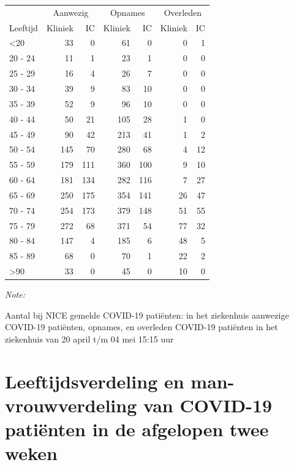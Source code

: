 \documentclass[
  english,
  man,floatsintext]{apa6}
\begin{document}
\begin{table}
\centering\begingroup\fontsize{10}{12}\selectfont

\begin{threeparttable}
\begin{tabular}{lrrrrrr}
\toprule
\multicolumn{1}{c}{ } & \multicolumn{2}{c}{Aanwezig} & \multicolumn{2}{c}{Opnames} & \multicolumn{2}{c}{Overleden} \\
\cmidrule(l{3pt}r{3pt}){2-3} \cmidrule(l{3pt}r{3pt}){4-5} \cmidrule(l{3pt}r{3pt}){6-7}
Leeftijd & Kliniek & IC & Kliniek & IC & Kliniek & IC\\
\midrule
<20 & 33 & 0 & 61 & 0 & 0 & 1\\
20 - 24 & 11 & 1 & 23 & 1 & 0 & 0\\
25 - 29 & 16 & 4 & 26 & 7 & 0 & 0\\
30 - 34 & 39 & 9 & 83 & 10 & 0 & 0\\
35 - 39 & 52 & 9 & 96 & 10 & 0 & 0\\
40 - 44 & 50 & 21 & 105 & 28 & 1 & 0\\
45 - 49 & 90 & 42 & 213 & 41 & 1 & 2\\
50 - 54 & 145 & 70 & 280 & 68 & 4 & 12\\
55 - 59 & 179 & 111 & 360 & 100 & 9 & 10\\
60 - 64 & 181 & 134 & 282 & 116 & 7 & 27\\
65 - 69 & 250 & 175 & 354 & 141 & 26 & 47\\
70 - 74 & 254 & 173 & 379 & 148 & 51 & 55\\
75 - 79 & 272 & 68 & 371 & 54 & 77 & 32\\
80 - 84 & 147 & 4 & 185 & 6 & 48 & 5\\
85 - 89 & 68 & 0 & 70 & 1 & 22 & 2\\
>90 & 33 & 0 & 45 & 0 & 10 & 0\\
\bottomrule
\end{tabular}
\begin{tablenotes}
\item \textit{Note: } 
\item Aantal bij NICE gemelde COVID-19 patiënten: in het ziekenhuis aanwezige COVID-19 patiënten, opnames, en overleden COVID-19 patiënten in het ziekenhuis van 20 april t/m 04 mei 15:15 uur
\end{tablenotes}
\end{threeparttable}
\endgroup{}
\end{table}

\newpage

\hypertarget{leeftijdsverdeling-en-man-vrouwverdeling-van-covid-19-patiuxebnten-in-de-afgelopen-twee-weken}{%
\section{Leeftijdsverdeling en man-vrouwverdeling van COVID-19 patiënten in de afgelopen twee weken}\label{leeftijdsverdeling-en-man-vrouwverdeling-van-covid-19-patiuxebnten-in-de-afgelopen-twee-weken}}
\end{document}
